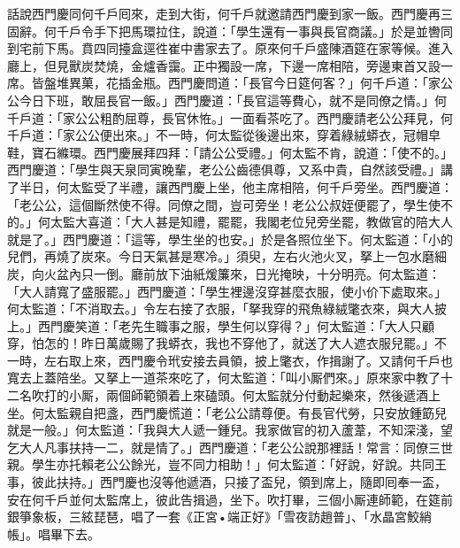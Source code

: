 話說西門慶同何千戶囘來，走到大街，何千戶就邀請西門慶到家一飯。西門慶再三固辭。何千戶令手下把馬環拉住，說道：「學生還有一事與長官商議。」於是並轡同到宅前下馬。賁四同擡盒逕徃崔中書家去了。原來何千戶盛陳酒筵在家等候。進入廳上，但見獸炭焚燒，金爐香靄。正中獨設一席，下邊一席相陪，旁邊東首又設一席。皆盤堆異菓，花插金瓶。西門慶問道：「長官今日筵何客？」何千戶道：「家公公今日下班，敢屈長官一飯。」西門慶道：「長官這等費心，就不是同僚之情。」何千戶道：「家公公粗酌屈尊，長官休恠。」一面看茶吃了。西門慶請老公公拜見，何千戶道：「家公公便出來。」不一時，何太監從後邊出來，穿着綠絨蟒衣，冠帽皁鞋，寶石縧環。西門慶展拜四拜：「請公公受禮。」何太監不肯，說道：「使不的。」{}西門慶道：「學生與天泉同寅晚輩，老公公齒德俱尊，又系中貴，自然該受禮。」講了半日，何太監受了半禮，讓西門慶上坐，他主席相陪，何千戶旁坐。西門慶道：「老公公，這個斷然使不得。同僚之間，豈可旁坐！老公公叔姪便罷了，學生使不的。」何太監大喜道：「大人甚是知禮，{}罷罷，我閣老位兒旁坐罷，教做官的陪大人就是了。」西門慶道：「這等，學生坐的也安。」於是各照位坐下。何太監道：「小的兒們，{}再燒了炭來。今日天氣甚是寒冷。」須臾，左右火池火叉，拏上一包水磨細炭，向火盆內只一倒。廳前放下油紙煖簾來，日光掩映，十分明亮。何太監道：「大人請寬了盛服罷。」西門慶道：「學生裡邊沒穿甚麼衣服，使小价下處取來。」何太監道：「不消取去。」令左右接了衣服，「拏我穿的飛魚綠絨氅衣來，與大人披上。」西門慶笑道：「老先生職事之服，學生何以穿得？」{}何太監道：「大人只顧穿，怕怎的！昨日萬歲賜了我蟒衣，我也不穿他了，就送了大人遮衣服兒罷。」不一時，左右取上來，西門慶令玳安接去員領，披上氅衣，作揖謝了。又請何千戶也寬去上蓋陪坐。又拏上一道茶來吃了，何太監道：「叫小厮們來。」{}{}原來家中教了十二名吹打的小厮，兩個師範領着上來磕頭。何太監就分付動起樂來，然後遞酒上坐。何太監親自把盞，西門慶慌道：「老公公請尊便。有長官代勞，只安放鍾筯兒就是一般。」何太監道：「我與大人遞一鍾兒。我家做官的初入蘆葦，不知深淺，望乞大人凡事扶持一二，就是情了。」{}西門慶道：「老公公說那裡話！常言：同僚三世親。學生亦托賴老公公餘光，豈不同力相助！」{}何太監道：「好說，好說。共同王事，彼此扶持。」西門慶也沒等他遞酒，只接了盃兒，領到席上，隨即囘奉一盃，安在何千戶並何太監席上，彼此告揖過，坐下。吹打畢，三個小厮連師範，在筵前銀箏象板，三絃琵琶，唱了一套《正宮•端正好》「雪夜訪趙普」、「水晶宮鮫綃帳」。唱畢下去。

